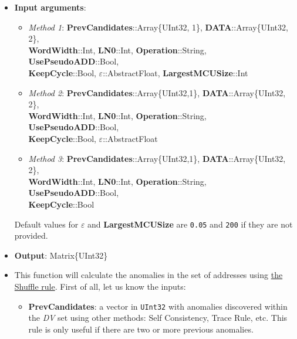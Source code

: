  \begin{itemize}
 	\item \textbf{Input arguments}: 
 		\begin{itemize}
 		\item \textit{Method 1}: \textbf{PrevCandidates}::Array\{UInt32, 1\}, \textbf{DATA}::Array\{UInt32, 2\}, \\ \textbf{WordWidth}::Int, \textbf{LN0}::Int,  \textbf{Operation}::String, \textbf{UsePseudoADD}::Bool, \\ \textbf{KeepCycle}::Bool, \textbf{\(\varepsilon\)}::AbstractFloat, \textbf{LargestMCUSize}::Int
%
		\item \textit{Method 2}:
			\textbf{PrevCandidates}::Array\{UInt32,1\}, \textbf{DATA}::Array\{UInt32, 2\}, \\ \textbf{WordWidth}::Int, \textbf{LN0}::Int,  \textbf{Operation}::String, \textbf{UsePseudoADD}::Bool, \\  \textbf{KeepCycle}::Bool, \textbf{\(\varepsilon\)}::AbstractFloat
		\item \textit{Method 3}: 			%
			\textbf{PrevCandidates}::Array\{UInt32,1\}, \textbf{DATA}::Array\{UInt32, 2\}, \\ \textbf{WordWidth}::Int, \textbf{LN0}::Int,  \textbf{Operation}::String, \textbf{UsePseudoADD}::Bool, \\ \textbf{KeepCycle}::Bool
 		\end{itemize}
 		Default values for \textbf{\(\varepsilon\)} and \textbf{LargestMCUSize} are \texttt{0.05} and \texttt{200} if they are not provided.
 		\item \textbf{Output}: Matrix\{UInt32\}
 		\item This function will calculate the anomalies in the set of addresses using \hyperref[Subsec:ShuffleRule]{the Shuffle rule}. 
 		First of all, let us know the inputs:
 		\begin{itemize}
 			
 			\item \textbf{PrevCandidates}: a vector in \texttt{UInt32} with anomalies discovered within the \textit{DV} set using other methods: Self Consistency, Trace Rule, etc. This rule is only useful if there are two or more previous anomalies. 
 			

\end{itemize}
\end{itemize}
